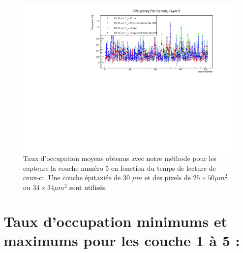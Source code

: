 \begin{appendices}
   \begin{figure}[!htb]
    \begin{center}
      \includegraphics[scale=0.80]{./figures/sensors_Readout_Time/resultOccupancyPerSensor/occupancyPerSensor_Layer5_epi30um.pdf}
      \caption{Taux d'occupation moyens obtenus avec notre m\'ethode pour les capteurs la couche num\'ero 5 en fonction du temps de lecture de ceux-ci. Une couche \'epitaxi\'ee de 30 $\mu m$ et des pixels de $25 \times 50 \mu m^2$ ou $34 \times 34 \mu m^2$ sont utilis\'es.}
      \label{fig:OccupancyLayer5_epi30um}
    \end{center}
  \end{figure}
  
  
  \section{Taux d'occupation minimums et maximums pour les couche 1 \`a 5 :}
  \label{annexe:Tx_Occ_Min_Max}
    

\end{appendices}
